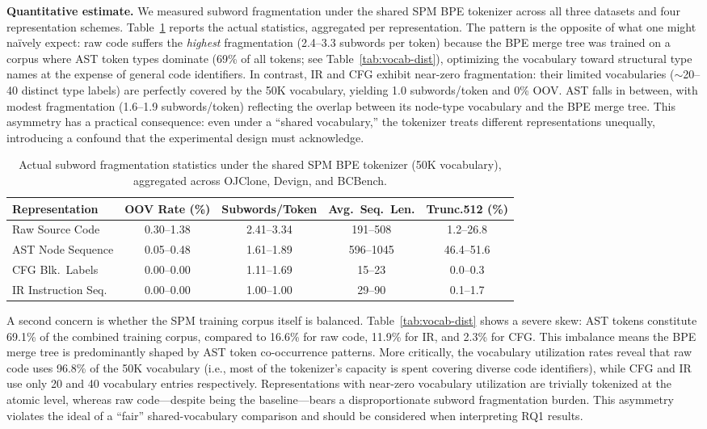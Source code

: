 \documentclass[pdflatex,sn-mathphys,Numbered]{sn-jnl}
\begin{document}
\textbf{Quantitative estimate.} We measured subword fragmentation under the shared SPM BPE tokenizer across all three datasets and four representation schemes. Table~\ref{tab:frag} reports the actual statistics, aggregated per representation. The pattern is the opposite of what one might na\"ively expect: raw code suffers the \emph{highest} fragmentation (2.4--3.3 subwords per token) because the BPE merge tree was trained on a corpus where AST token types dominate (69\% of all tokens; see Table~\ref{tab:vocab-dist}), optimizing the vocabulary toward structural type names at the expense of general code identifiers. In contrast, IR and CFG exhibit near-zero fragmentation: their limited vocabularies ($\sim$20--40 distinct type labels) are perfectly covered by the 50K vocabulary, yielding 1.0 subwords/token and 0\% OOV. AST falls in between, with modest fragmentation (1.6--1.9 subwords/token) reflecting the overlap between its node-type vocabulary and the BPE merge tree. This asymmetry has a practical consequence: even under a ``shared vocabulary,'' the tokenizer treats different representations unequally, introducing a confound that the experimental design must acknowledge.

\begin{table}[tb]
\centering
\caption{Actual subword fragmentation statistics under the shared SPM BPE tokenizer (50K vocabulary), aggregated across OJClone, Devign, and BCBench.}\label{tab:frag}
\begin{tabular}{lcccc}
\toprule
Representation & OOV Rate (\%) & Subwords/Token & Avg.\ Seq.\ Len. & Trunc.\@512 (\%) \\
\midrule
Raw Source Code  & 0.30--1.38 & 2.41--3.34 & 191--508 & 1.2--26.8 \\
AST Node Sequence& 0.05--0.48 & 1.61--1.89 & 596--1045 & 46.4--51.6 \\
CFG Blk.\ Labels  & 0.00--0.00 & 1.11--1.69 & 15--23 & 0.0--0.3 \\
IR Instruction Seq.& 0.00--0.00 & 1.00--1.00 & 29--90 & 0.1--1.7 \\
\bottomrule
\end{tabular}
\end{table}

A second concern is whether the SPM training corpus itself is balanced. Table~\ref{tab:vocab-dist} shows a severe skew: AST tokens constitute 69.1\% of the combined training corpus, compared to 16.6\% for raw code, 11.9\% for IR, and 2.3\% for CFG. This imbalance means the BPE merge tree is predominantly shaped by AST token co-occurrence patterns. More critically, the vocabulary utilization rates reveal that raw code uses 96.8\% of the 50K vocabulary (i.e., most of the tokenizer's capacity is spent covering diverse code identifiers), while CFG and IR use only 20 and 40 vocabulary entries respectively. Representations with near-zero vocabulary utilization are trivially tokenized at the atomic level, whereas raw code---despite being the baseline---bears a disproportionate subword fragmentation burden. This asymmetry violates the ideal of a ``fair'' shared-vocabulary comparison and should be considered when interpreting RQ1 results.
\end{document}
